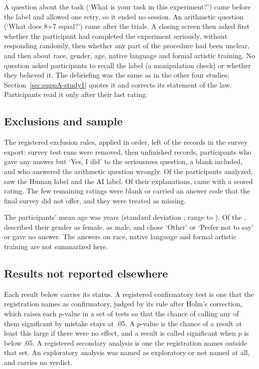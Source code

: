 A question about the task (`What is your task in this experiment?') came before the label and allowed one retry, so it ended no session. An arithmetic question (`What does 8+7 equal?') came after the trials. A closing screen then asked first whether the participant had completed the experiment seriously, without responding randomly, then whether any part of the procedure had been unclear, and then about race, gender, age, native language and formal artistic training. No question asked participants to recall the label (a manipulation check) or whether they believed it. The debriefing was the same as in the other four studies; Section~\ref{sec:suppA-study1} quotes it and corrects its statement of the law. Participants read it only after their last rating.

\subsection*{Exclusions and sample}

The registered exclusion rules, applied in order, left \SThreeN{} of the \SThreeNRecords{} records in the survey export: \SThreeNPreviewRemoved{} survey test runs were removed, then \SThreeNUnfinishedRemoved{} unfinished records, \SThreeNNotSeriousRemoved{} participants who gave any answer but `Yes, I did' to the seriousness question, a blank included, and \SThreeNArithmeticRemoved{} who answered the arithmetic question wrongly. Of the \SThreeN{} participants analyzed, \SThreeNHuman{} saw the Human label and \SThreeNAI{} the AI label. Of their \SThreeNJustifications{} explanations, \SThreeNRatings{} came with a scored rating. The few remaining ratings were blank or carried an answer code that the final survey did not offer, and they were treated as missing.

The participants' mean age was \SThreeAgeMean{} years (standard deviation \SThreeAgeSD; range \SThreeAgeMin{} to \SThreeAgeMax). Of the \SThreeN, \SThreeNWomen{} described their gender as female, \SThreeNMen{} as male, and \SThreeNGenderOther{} chose `Other' or `Prefer not to say' or gave no answer. The answers on race, native language and formal artistic training are not summarized here.

\subsection*{Results not reported elsewhere}

Each result below carries its status. A registered confirmatory test is one that the registration names as confirmatory, judged by its rule after Holm's correction, which raises each $p$-value in a set of tests so that the chance of calling any of them significant by mistake stays at .05. A $p$-value is the chance of a result at least this large if there were no effect, and a result is called significant when $p$ is below .05. A registered secondary analysis is one the registration names outside that set. An exploratory analysis was named as exploratory or not named at all, and carries no verdict.

